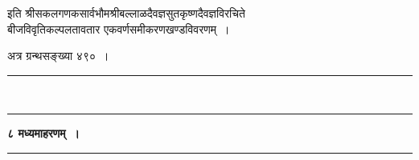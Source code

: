 \documentclass[11pt, openany]{book}
\begin{document}
\begin{sloppypar}
\begin{center}

इति श्रीसकलगणकसार्वभौमश्रीबल्लाळदैवज्ञसुतकृष्णदैवज्ञविरचिते \\
बीजविवृतिकल्पलतावतार एकवर्णसमीकरणखण्डविवरणम्~।
\vspace{2mm}

अत्र ग्रन्थसङ्ख्या ४९०~।
\vspace{6mm}

\rule{0.2\linewidth}{0.8pt}\\
\vspace{-4mm}

\rule{0.2\linewidth}{0.8pt}
\end{center}
\end{sloppypar}

\newpage
\thispagestyle{empty}

\begin{center}
\textbf{\large ८\; मध्यमाहरणम्~।}\\
\rule{0.2\linewidth}{0.8pt}
\end{center}
\end{document}
